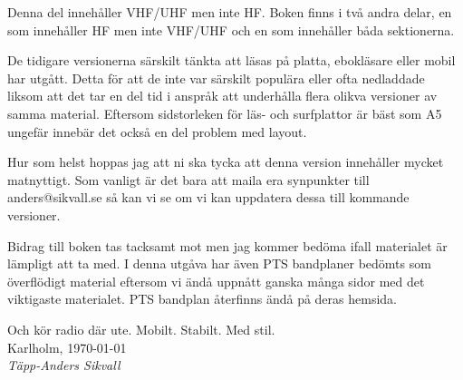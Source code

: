 Denna del innehåller VHF/UHF men inte HF. Boken finns i två andra
delar, en som innehåller HF men inte VHF/UHF och en som innehåller
båda sektionerna.
	
De tidigare versionerna särskilt tänkta att läsas på platta,
ebokläsare eller mobil har utgått. Detta för att de inte var särskilt
populära eller ofta nedladdade liksom att det tar en del tid i anspråk
att underhålla flera olikva versioner av samma material. Eftersom
sidstorleken för läs- och surfplattor är bäst som A5 ungefär innebär
det också en del problem med layout.
	
Hur som helst hoppas jag att ni ska tycka att denna version innehåller
mycket matnyttigt. Som vanligt är det bara att maila era synpunkter
till anders@sikvall.se så kan vi se om vi kan uppdatera dessa till
kommande versioner.
	
Bidrag till boken tas tacksamt mot men jag kommer bedöma ifall
materialet är lämpligt att ta med. I denna utgåva har även PTS
bandplaner bedömts som överflödigt material eftersom vi ändå uppnått
ganska många sidor med det viktigaste materialet. PTS bandplan
återfinns ändå på deras hemsida.
	
Och kör radio där ute. Mobilt. Stabilt. Med stil.\\[4em]
	
Karlholm, \today\\
\textit{Täpp-Anders Sikvall}

\clearpage
